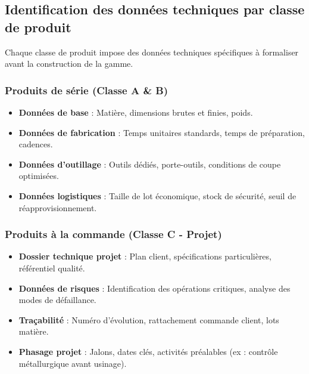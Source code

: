 \documentclass{article}
\begin{document}
\subsection{Identification des données techniques par classe de produit}

Chaque classe de produit impose des données techniques spécifiques à formaliser avant la construction de la gamme.

\subsubsection{Produits de série (Classe A \& B)}

\begin{itemize}
    \item \textbf{Données de base} : Matière, dimensions brutes et finies, poids.
    \item \textbf{Données de fabrication} : Temps unitaires standards, temps de préparation, cadences.
    \item \textbf{Données d'outillage} : Outils dédiés, porte-outils, conditions de coupe optimisées.
    \item \textbf{Données logistiques} : Taille de lot économique, stock de sécurité, seuil de réapprovisionnement.
\end{itemize}

\subsubsection{Produits à la commande (Classe C - Projet)}

\begin{itemize}
    \item \textbf{Dossier technique projet} : Plan client, spécifications particulières, référentiel qualité.
    \item \textbf{Données de risques} : Identification des opérations critiques, analyse des modes de défaillance.
    \item \textbf{Traçabilité} : Numéro d'évolution, rattachement commande client, lots matière.
    \item \textbf{Phasage projet} : Jalons, dates clés, activités préalables (ex : contrôle métallurgique avant usinage).
\end{itemize}
\end{document}
